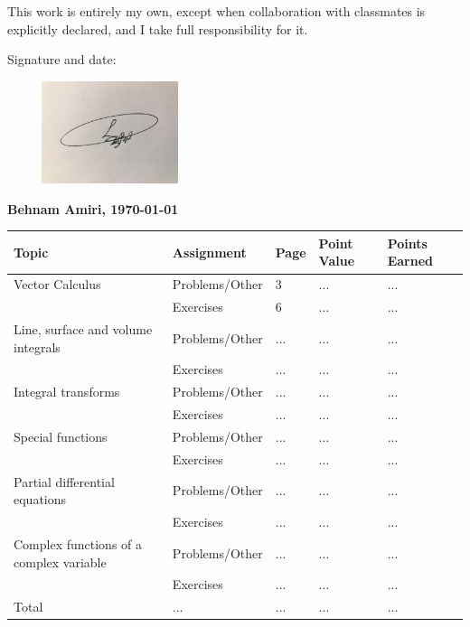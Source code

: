 \documentclass[fleqn]{article}
\begin{document}
\bigbreak

\Large This work is entirely my own, except when collaboration with classmates is explicitly declared, and I take full responsibility for it.

\bigbreak

\Large Signature and date:

\bigbreak

\bigbreak


\includegraphics[height=3cm, width=6cm]{signature.jpg}

\Large \textbf{ Behnam Amiri, \today }


\pagebreak

\begin{singlespace}
  \begin{tabular}{ |p{3cm}|||p{4cm}|p{2cm}|p{2cm}|p{2cm}|  }
      \hline
      Topic & Assignment & Page & Point Value & Points Earned \\
      \hline
      Vector Calculus & \cellcolor{contents} Problems/Other & \cellcolor{contents} 3 &\cellcolor{contents}  ... &\cellcolor{contents}  ... \\
      & \cellcolor{contents} Exercises &\cellcolor{contents}  6 & \cellcolor{contents}  ... &\cellcolor{contents}  ... \\
      \hline
      Line, surface and volume integrals & Problems/Other & ... & ... & ... \\
      & Exercises & ... & ... & ... \\
      \hline
      Integral transforms & \cellcolor{contents} Problems/Other &\cellcolor{contents}  ... &\cellcolor{contents}  ... & \cellcolor{contents} ... \\
      & \cellcolor{contents} Exercises &\cellcolor{contents}  ... &\cellcolor{contents}  ... &\cellcolor{contents}  ... \\
      \hline
      Special functions & Problems/Other & ... & ... & ... \\
      & Exercises & ... & ... & ... \\
      \hline
      Partial differential equations  &\cellcolor{contents} Problems/Other &\cellcolor{contents} ... &\cellcolor{contents} ... &\cellcolor{contents} ... \\
      & \cellcolor{contents} Exercises &\cellcolor{contents}  ... &\cellcolor{contents}  ... &\cellcolor{contents}  ... \\
      \hline
      Complex functions of a complex variable & Problems/Other & ...  & ... & ... \\
      & Exercises  & ...  & ... & ... \\
      \hline
      Total & ... & ... & ... & ... \\
      \hline
  \end{tabular}
\end{singlespace}
\end{document}
